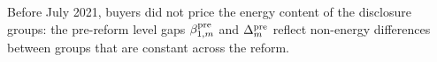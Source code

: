 \label{assum:no_pre_pricing}
Before July 2021, buyers did not price the energy content of the disclosure groups: the pre-reform level gaps $\beta_{1,m}^{\rm pre}$ and $\Delta_m^{\rm pre}$ reflect non-energy differences between groups that are constant across the reform.
